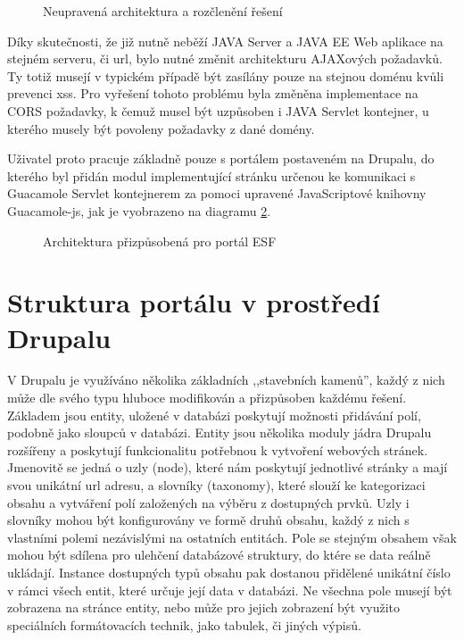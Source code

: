 \begin{figure}[htp] 
  \caption{Neupravená architektura a rozčlenění řešení}
  \label{fig:arch_guacamole}
\end{figure}  

Díky skutečnosti, že již nutně neběží JAVA Server a JAVA EE Web aplikace na stejném serveru, či url, bylo nutné změnit architekturu AJAXových požadavků. Ty totiž musejí v typickém případě být zasílány pouze na stejnou doménu kvůli prevenci \gls{xss}. Pro vyřešení tohoto problému byla změněna implementace na CORS požadavky, k čemuž musel být uzpůsoben i JAVA Servlet kontejner, u kterého musely být povoleny požadavky z dané domény. 

Uživatel proto pracuje základně pouze s portálem postaveném na Drupalu, do kterého byl přidán modul implementující stránku určenou ke komunikaci s Guacamole Servlet kontejnerem za pomoci upravené JavaScriptové knihovny Guacamole-js, jak je vyobrazeno na diagramu \ref{fig:arch_drupal}.

\begin{figure}[htp] 
  \caption{Architektura přizpůsobená pro portál ESF}
  \label{fig:arch_drupal}
\end{figure}  

\section{Struktura portálu v prostředí Drupalu}

V Drupalu je využíváno několika základních ,,stavebních kamenů'', každý z nich může dle svého typu hluboce modifikován a přizpůsoben každému řešení. Základem jsou entity, uložené v databázi poskytují možnosti přidávání polí, podobně jako sloupců v databázi. Entity jsou několika moduly jádra Drupalu rozšířeny a poskytují funkcionalitu potřebnou k vytvoření webových stránek. Jmenovitě se jedná o uzly (node), které nám poskytují jednotlivé stránky a mají svou unikátní url adresu, a slovníky (taxonomy), které slouží ke kategorizaci obsahu a vytváření polí založených na výběru z dostupných prvků. Uzly i slovníky mohou být konfigurovány ve formě druhů obsahu, každý z nich s vlastními polemi nezávislými na ostatních entitách. Pole se stejným obsahem však mohou být sdílena pro ulehčení databázové struktury, do ktére se data reálně ukládají. Instance dostupných typů obsahu pak dostanou přidělené unikátní číslo v rámci všech entit, které určuje její data v databázi. Ne všechna pole musejí být zobrazena na stránce entity, nebo může pro jejich zobrazení být využito speciálních formátovacích technik, jako tabulek, či jiných výpisů.


